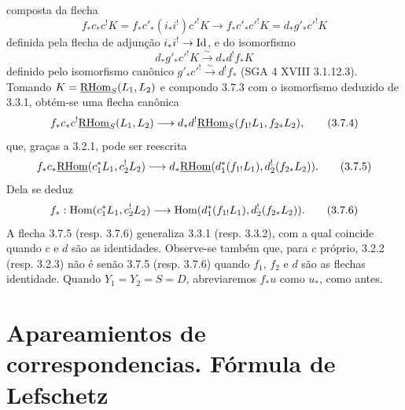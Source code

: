 composta da flecha
\[
f_*c_*c^!K=f_*c'_*(i_*i^!)c'^!K\longrightarrow f_*c'_*c'^!K=d_*g'_*c'^!K
\]
definida pela flecha de adjunção $i_*i^!\to\mathrm{Id}$, e do isomorfismo
\[
d_*g'_*c'^!K\xrightarrow{\sim}d_*d^!f_*K
\]
definido pelo isomorfismo canônico $g'_*c'^!\xrightarrow{\sim}d^!f_*$ (SGA 4 XVIII 3.1.12.3). Tomando $K=\underline{\mathrm{RHom}}_S(L_1,L_2)$ e compondo 3.7.3 com o isomorfismo deduzido de 3.3.1, obtém-se uma flecha canônica
\begin{equation}
f_*c_*c^!\underline{\mathrm{RHom}}_S(L_1,L_2)
\longrightarrow
 d_*d^!\underline{\mathrm{RHom}}_S(f_{1!}L_1,f_{2*}L_2),
\tag{3.7.4}
\end{equation}
que, graças a 3.2.1, pode ser reescrita
\begin{equation}
f_*c_*\underline{\mathrm{RHom}}(c_1^*L_1,c_2^!L_2)
\longrightarrow
 d_*\underline{\mathrm{RHom}}(d_1^*(f_{1!}L_1),d_2^!(f_{2*}L_2)).
\tag{3.7.5}
\end{equation}
Dela se deduz
\begin{equation}
f_*:\operatorname{Hom}(c_1^*L_1,c_2^!L_2)
\longrightarrow
\operatorname{Hom}(d_1^*(f_{1!}L_1),d_2^!(f_{2*}L_2)).
\tag{3.7.6}
\end{equation}
A flecha 3.7.5 (resp. 3.7.6) generaliza 3.3.1 (resp. 3.3.2), com a qual coincide quando $c$ e $d$ são as identidades. Observe-se também que, para $c$ próprio, 3.2.2 (resp. 3.2.3) não é senão 3.7.5 (resp. 3.7.6) quando $f_1$, $f_2$ e $d$ são as flechas identidade. Quando $Y_1=Y_2=S=D$, abreviaremos $f_*u$ como $u_*$, como antes.

\section{Apareamientos de correspondencias. Fórmula de Lefschetz}

